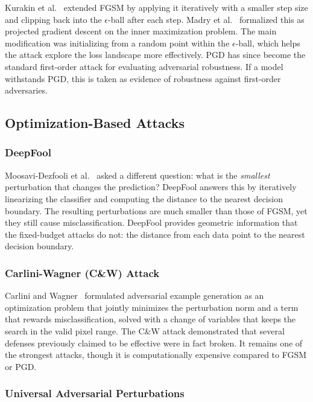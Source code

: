 Kurakin et al.~\cite{kurakin2016adversarialphysical} extended FGSM by applying it iteratively with a smaller step size and clipping back into the $\epsilon$-ball after each step. Madry et al.~\cite{madry2018towards} formalized this as projected gradient descent on the inner maximization problem. The main modification was initializing from a random point within the $\epsilon$-ball, which helps the attack explore the loss landscape more effectively. PGD has since become the standard first-order attack for evaluating adversarial robustness. If a model withstands PGD, this is taken as evidence of robustness against first-order adversaries.

\subsection{Optimization-Based Attacks}

\subsubsection{DeepFool}

Moosavi-Dezfooli et al.~\cite{moosavidezfooli2016deepfool} asked a different question: what is the \emph{smallest} perturbation that changes the prediction? DeepFool answers this by iteratively linearizing the classifier and computing the distance to the nearest decision boundary. The resulting perturbations are much smaller than those of FGSM, yet they still cause misclassification. DeepFool provides geometric information that the fixed-budget attacks do not: the distance from each data point to the nearest decision boundary.

\subsubsection{Carlini-Wagner (C\&W) Attack}

Carlini and Wagner~\cite{carlini2017towards} formulated adversarial example generation as an optimization problem that jointly minimizes the perturbation norm and a term that rewards misclassification, solved with a change of variables that keeps the search in the valid pixel range. The C\&W attack demonstrated that several defenses previously claimed to be effective were in fact broken. It remains one of the strongest attacks, though it is computationally expensive compared to FGSM or PGD.

\subsubsection{Universal Adversarial Perturbations}

